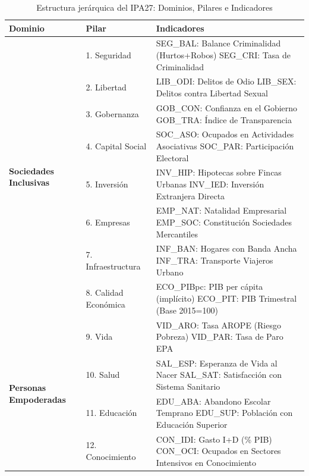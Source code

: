 \documentclass[authoryear,12pt]{elsarticle}
\begin{document}
\begin{table}[h!]
\centering
\footnotesize
\begin{tabular}{p{3.5cm}p{4cm}p{6cm}}
\toprule
\textbf{Dominio} & \textbf{Pilar} & \textbf{Indicadores} \\
\midrule
\multirow{8}{3.5cm}{\textbf{Sociedades Inclusivas}}
& 1. Seguridad & SEG\_BAL: Balance Criminalidad (Hurtos+Robos) \newline SEG\_CRI: Tasa de Criminalidad \\
\cmidrule{2-3}
& 2. Libertad & LIB\_ODI: Delitos de Odio \newline LIB\_SEX: Delitos contra Libertad Sexual \\
\cmidrule{2-3}
& 3. Gobernanza & GOB\_CON: Confianza en el Gobierno \newline GOB\_TRA: Índice de Transparencia \\
\cmidrule{2-3}
& 4. Capital Social & SOC\_ASO: Ocupados en Actividades Asociativas \newline SOC\_PAR: Participación Electoral \\
\midrule
\multirow{8}{3.5cm}{\textbf{Economías Abiertas}}
& 5. Inversión & INV\_HIP: Hipotecas sobre Fincas Urbanas \newline INV\_IED: Inversión Extranjera Directa \\
\cmidrule{2-3}
& 6. Empresas & EMP\_NAT: Natalidad Empresarial \newline EMP\_SOC: Constitución Sociedades Mercantiles \\
\cmidrule{2-3}
& 7. Infraestructura & INF\_BAN: Hogares con Banda Ancha \newline INF\_TRA: Transporte Viajeros Urbano \\
\cmidrule{2-3}
& 8. Calidad Económica & ECO\_PIBpc: PIB per cápita (implícito) \newline ECO\_PIT: PIB Trimestral (Base 2015=100) \\
\midrule
\multirow{8}{3.5cm}{\textbf{Personas Empoderadas}}
& 9. Vida & VID\_ARO: Tasa AROPE (Riesgo Pobreza) \newline VID\_PAR: Tasa de Paro EPA \\
\cmidrule{2-3}
& 10. Salud & SAL\_ESP: Esperanza de Vida al Nacer \newline SAL\_SAT: Satisfacción con Sistema Sanitario \\
\cmidrule{2-3}
& 11. Educación & EDU\_ABA: Abandono Escolar Temprano \newline EDU\_SUP: Población con Educación Superior \\
\cmidrule{2-3}
& 12. Conocimiento & CON\_IDI: Gasto I+D (\% PIB) \newline CON\_OCI: Ocupados en Sectores Intensivos en Conocimiento \\
\bottomrule
\end{tabular}
\caption{Estructura jerárquica del IPA27: Dominios, Pilares e Indicadores}
\label{tab:estructura}
\end{table}
\end{document}
